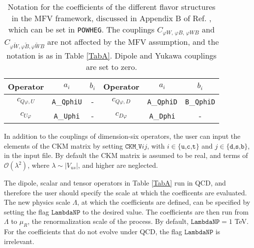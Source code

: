 \documentclass[paper]{JHEP3}
\begin{document}
\begin{table}
\center
\begin{tabular}{||c|c  c|| c | c c || }
\hline
	Operator    & $a_i$ & $b_i$ & Operator & $a_i$ & $b_i$\\\hline
$	c_{Q\varphi,U}$ & \texttt{A}\_\texttt{QphiU} & - &
$	c_{Q\varphi,D}$ & \texttt{A}\_\texttt{QphiD} & \texttt{B}\_\texttt{QphiD}  \\
$	c_{U\varphi }$  & \texttt{A}\_\texttt{Uphi} &-&
$	c_{D\varphi }$  & \texttt{A}\_\texttt{Dphi}&- \\
\hline
\end{tabular}
\caption{Notation for the coefficients of the different flavor structures in the MFV framework, discussed in Appendix B of Ref. \cite{Alioli:2018ljm}, which can be set in \texttt{POWHEG}.
The couplings $C_{\varphi W,\, \varphi B, \, \varphi W B}$ and $C_{\varphi \tilde{W},\varphi \tilde{B},\varphi \tilde{W} B}$ are not affected by the MFV assumption, and the notation is as in Table 
\ref{TabA}. Dipole and Yukawa couplings are set to zero.
}\label{tab:mfv}
\end{table}

In addition to the couplings of dimension-six operators, the user can input the elements of the CKM matrix by setting  $\texttt{CKM\_V}ij$, with $i \in \{\texttt{u,c,t}\}$ and $j \in \{ \texttt{d,s,b}\}$,
in the input file. By default the CKM matrix is assumed to be real, and terms of $\mathcal O(\lambda^2)$, where $\lambda \sim |V_{us}|$, and higher are neglected. 

The dipole, scalar and tensor operators in Table \ref{TabA} run in QCD, and therefore the user should specify the scale at which the coefficents are evaluated.
The new physics scale $\Lambda$, at which the coefficients are defined, can be specified 
by setting the flag $\texttt{LambdaNP}$ to the desired value. 
The coefficients are then run from $\Lambda$ to $\mu_R$, the renormalization scale of the  process. By default, $\texttt{LambdaNP} = 1$ TeV.
For the coefficients that do not evolve under QCD, the flag $\texttt{LambdaNP}$ is irrelevant.
\end{document}
